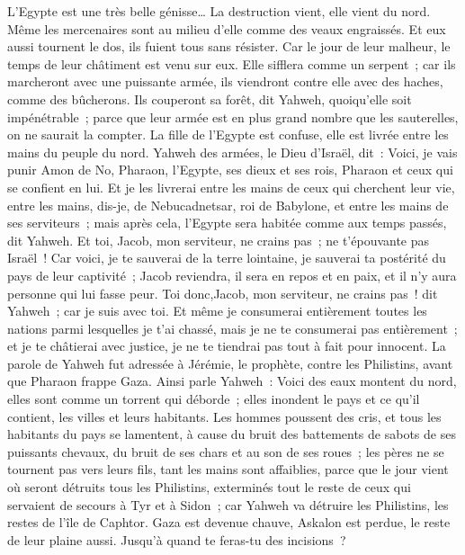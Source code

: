 \begin{multicols}{2}
L'Egypte est une très belle génisse… La destruction vient, elle vient du nord.
Même les mercenaires sont au milieu d'elle comme des veaux engraissés. Et eux aussi tournent le dos, ils fuient tous sans résister. Car le jour de leur malheur, le temps de leur châtiment est venu sur eux.
Elle sifflera comme un serpent~; car ils marcheront avec une puissante armée, ils viendront contre elle avec des haches, comme des bûcherons.
Ils couperont sa forêt, dit Yahweh, quoiqu'elle soit impénétrable~; parce que leur armée est en plus grand nombre que les sauterelles, on ne saurait la compter.
La fille de l'Egypte est confuse, elle est livrée entre les mains du peuple du nord.
Yahweh des armées, le Dieu d'Israël, dit~: Voici, je vais punir Amon de No, Pharaon, l'Egypte, ses dieux et ses rois, Pharaon et ceux qui se confient en lui.
Et je les livrerai entre les mains de ceux qui cherchent leur vie, entre les mains, dis-je, de Nebucadnetsar, roi de Babylone, et entre les mains de ses serviteurs~; mais après cela, l'Egypte sera habitée comme aux temps passés, dit Yahweh.
Et toi, Jacob, mon serviteur, ne crains pas~; ne t'épouvante pas Israël~! Car voici, je te sauverai de la terre lointaine, je sauverai ta postérité du pays de leur captivité~; Jacob reviendra, il sera en repos et en paix, et il n'y aura personne qui lui fasse peur.
Toi donc,Jacob, mon serviteur, ne crains pas~! dit Yahweh~; car je suis avec toi. Et même je consumerai entièrement toutes les nations parmi lesquelles je t'ai chassé, mais je ne te consumerai pas entièrement~; et je te châtierai avec justice, je ne te tiendrai pas tout à fait pour innocent.
\VerseOne{}La parole de Yahweh fut adressée à Jérémie, le prophète, contre les Philistins, avant que Pharaon frappe Gaza.
Ainsi parle Yahweh~: Voici des eaux montent du nord, elles sont comme un torrent qui déborde~; elles inondent le pays et ce qu'il contient, les villes et leurs habitants. Les hommes poussent des cris, et tous les habitants du pays se lamentent,
à cause du bruit des battements de sabots de ses puissants chevaux, du bruit de ses chars et au son de ses roues~; les pères ne se tournent pas vers leurs fils, tant les mains sont affaiblies,
parce que le jour vient où seront détruits tous les Philistins, exterminés tout le reste de ceux qui servaient de secours à Tyr et à Sidon~; car Yahweh va détruire les Philistins, les restes de l'île de Caphtor.
Gaza est devenue chauve, Askalon est perdue, le reste de leur plaine aussi. Jusqu'à quand te feras-tu des incisions~?

\end{multicols}
